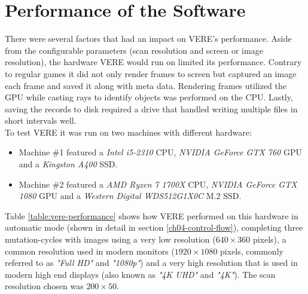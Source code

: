 \section{Performance of the Software}
There were several factors that had an impact on \ac{VERE}'s performance. Aside from the configurable parameters (scan resolution and screen or image resolution), the hardware \ac{VERE} would run on limited its performance. Contrary to regular games it did not only render frames to screen but captured an image each frame and saved it along with meta data. Rendering frames utilized the GPU while casting rays to identify objects was performed on the CPU. Lastly, saving the records to disk required a drive that handled writing multiple files in short intervals well.\\
To test \ac{VERE} it was run on two machines with different hardware:
\begin{itemize}
    \item Machine \#1 featured a \textit{Intel i5-2310} CPU, \textit{NVIDIA GeForce GTX 760} GPU and a \textit{Kingston A400} SSD.
    \item Machine \#2 featured a \textit{AMD Ryzen 7 1700X} CPU, \textit{NVIDIA GeForce GTX 1080} GPU and a \textit{Western Digital WDS512G1X0C} M.2 SSD.
\end{itemize}
Table \ref{table:vere-performance} shows how \ac{VERE} performed on this hardware in automatic mode (shown in detail in section \ref{ch04-control-flow}), completing three mutation-cycles with images using a very low resolution ($640 \times 360$ pixels), a common resolution used in modern monitors ($1920 \times 1080$ pixels, commonly referred to as \textit{"Full HD"} and \textit{"1080p"}) and a very high resolution that is used in modern high end displays (also known as \textit{"4K UHD"} and \textit{"4K"}). The scan resolution chosen was $200 \times 50$.

\newcommand{\minitab}[2][l]{\begin{tabular}{#1}#2\end{tabular}}

